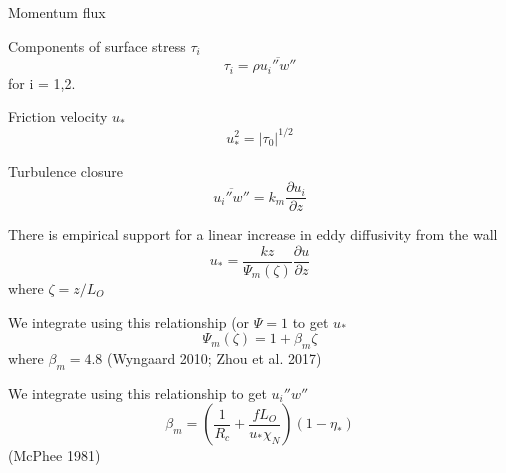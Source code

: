Momentum flux

    Components of surface stress $\tau_i$
    \begin{equation*}
    \tau_i = \rho \overline{u_i''w''}
    \end{equation*}
    for i = 1,2.

    Friction velocity $u_*$
    \begin{equation*}
    u_*^2=|\tau_0|^{1/2}
    \end{equation*}

    Turbulence closure
    \begin{equation*}
    \overline{u_i''w''} = k_m \frac{\partial u_i}{\partial z}
    \end{equation*}

    There is empirical support for a linear increase in eddy diffusivity from the wall
    \begin{equation*}
    u_* = \frac{k z}{\Psi_m(\zeta) } \frac{\partial u}{\partial z}
    \end{equation*}
    where $\zeta = z/L_O$
    
    We integrate using this relationship (or $\Psi = 1$ to get $u_*$
    \begin{equation*}
    \Psi_m(\zeta) = 1 + \beta_m \zeta
    \end{equation*}
    where $\beta_m = 4.8$ (Wyngaard 2010; Zhou et al. 2017)

    We integrate using this relationship to get $u_i''w''$
    \begin{equation*}
    \beta_m = (\frac{1}{R_c} + \frac{f L_O}{u_* \chi_N})(1-\eta_*)
    \end{equation*}
    (McPhee 1981)
    
    
